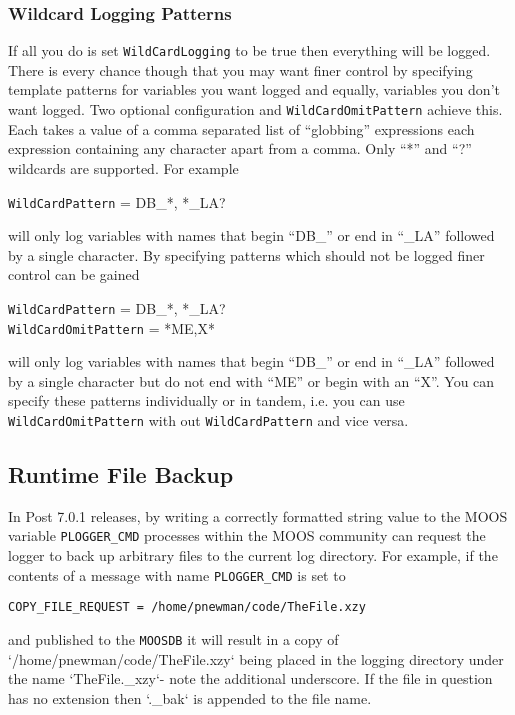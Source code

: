 \documentclass[a4paper,10pt]{article}
\newcommand{\Code}[1]{\texttt{#1} }
\newcommand{\code}[1]{\Code{#1} }
\newcommand{\DB}   {\code{{MOOSDB}}}
\begin{document}
\subsubsection{Wildcard Logging Patterns}

If all you do is set \code{WildCardLogging} to be true then everything will be logged. There is every chance though that you may want finer control by specifying template patterns for variables you want logged and equally, variables you don't want logged. Two optional configuration \code{} and \code{WildCardOmitPattern} achieve this. Each takes a value of a comma separated list of  ``globbing'' expressions each expression containing any character apart from a comma. Only ``*'' and ``?'' wildcards are supported. For example

\begin{center}
\code{WildCardPattern} =  DB\_*, *\_LA?
\end{center}

will only log variables with names that begin ``DB\_'' or end in ``\_LA'' followed by a single character. By specifying patterns which should not be logged finer control can be gained

\begin{center}
\code{WildCardPattern} =  DB\_*, *\_LA? \\
\code{WildCardOmitPattern} =  *ME,X*
\end{center}

will only log variables with names that  begin ``DB\_'' or end in ``\_LA'' followed by a single character but do not end with ``ME'' or begin with an ``X''. You can specify these patterns individually or  in tandem, i.e. you can use \code{WildCardOmitPattern}  with out \code{WildCardPattern}  and vice versa.


\subsection{Runtime File Backup}
In Post 7.0.1 releases, by writing a correctly formatted string value to the MOOS variable \code{PLOGGER\_CMD} processes within the MOOS community can request the logger to back up arbitrary files to the current log directory. For example, if the contents of a message with name \code{PLOGGER\_CMD} is set to
\begin{center}
\code{COPY\_FILE\_REQUEST = /home/pnewman/code/TheFile.xzy}
\end{center}
 and published to the \DB  it will result in a copy of `/home/pnewman/code/TheFile.xzy` being placed in the logging directory under the name `TheFile.\_xzy`- note the additional underscore. If the file in question has no extension then `.\_bak` is appended to the file name.
\end{document}
